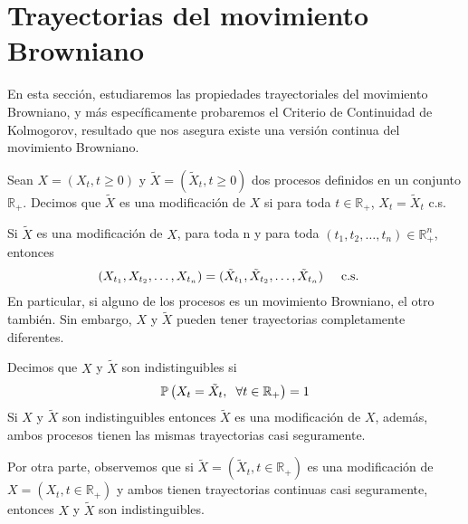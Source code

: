 \section{Trayectorias del movimiento Browniano}
En esta sección, estudiaremos las propiedades trayectoriales del movimiento Browniano, y más específicamente probaremos el Criterio de Continuidad de Kolmogorov, resultado que nos asegura existe una versión continua del movimiento Browniano.

\begin{definition}
Sean $X = (X_t, t \geq 0)$ y $\tilde{X} = (\tilde{X}_t, t \geq 0)$ dos procesos definidos en un conjunto $\mathbb{R}_{+}$. Decimos que $\tilde{X}$ es una modificación de $X$ si para toda $t \in \mathbb{R}_{+}$, $X_t = \tilde{X}_t$ c.s.
\end{definition}

Si $\tilde{X}$ es una modificación de $X$, para toda n y para toda $(t_1, t_2, \ldots, t_n) \in \mathbb{R}_{+}^n$, entonces
  \begin{align*}
	(X_{t_1}, X_{t_2}, \ldots, X_{t_n}) & = (\tilde{X}_{t_1}, \tilde{X}_{t_2}, \ldots, \tilde{X}_{t_n}) \hspace{0.5cm} \text{c.s.}
  \end{align*}
En particular, si alguno de los procesos es un movimiento Browniano, el otro también. Sin embargo, $X$ y $\tilde{X}$ pueden tener trayectorias completamente diferentes.

\begin{definition}
Decimos que $X$ y $\tilde{X}$ son indistinguibles si
  \begin{align*}
	\mathbb{P} \left(X_t = \tilde{X}_t, \hspace{0.2cm} \forall t \in \mathbb{R}_{+} \right) = 1 
  \end{align*}
Si $X$ y $\tilde{X}$ son indistinguibles entonces $\tilde{X}$ es una modificación de $X$, además, ambos procesos tienen las mismas trayectorias casi seguramente.
\end{definition}

Por otra parte, observemos que si $\tilde{X} = (\tilde{X}_t, t \in \mathbb{R}_{+})$ es una modificación de $X = (X_t, t \in \mathbb{R}_{+})$ y ambos tienen trayectorias continuas casi seguramente, entonces $X$ y $\tilde{X}$ son indistinguibles.

